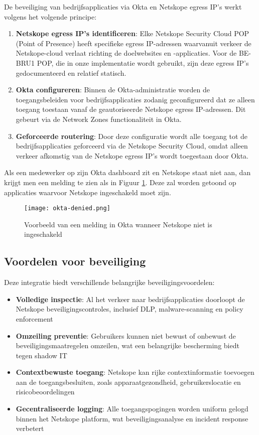 De beveiliging van bedrijfsapplicaties via Okta en Netskope egress IP's werkt volgens het volgende principe:

\begin{enumerate}
    \item \textbf{Netskope egress IP's identificeren}: Elke Netskope Security Cloud POP (Point of Presence) heeft specifieke egress IP-adressen waarvanuit verkeer de Netskope-cloud verlaat richting de doelwebsites en -applicaties. Voor de BE-BRU1 POP, die in onze implementatie wordt gebruikt, zijn deze egress IP's gedocumenteerd en relatief statisch.

    \item \textbf{Okta configureren}: Binnen de Okta-administratie worden de toegangsbeleiden voor bedrijfsapplicaties zodanig geconfigureerd dat ze alleen toegang toestaan vanaf de geautoriseerde Netskope egress IP-adressen. Dit gebeurt via de Network Zones functionaliteit in Okta.

    \item \textbf{Geforceerde routering}: Door deze configuratie wordt alle toegang tot de bedrijfsapplicaties geforceerd via de Netskope Security Cloud, omdat alleen verkeer afkomstig van de Netskope egress IP's wordt toegestaan door Okta.
\end{enumerate}

Als een medewerker op zijn Okta dashboard zit en Netskope staat niet aan, dan krijgt men een melding te zien als in Figuur \ref{fig:okta-denied}. Deze zal worden getoond op applicaties waarvoor Netskope ingeschakeld moet zijn.
\begin{figure}[H]
    \centering
    \texttt{[image: okta-denied.png]}
    \caption[Geen Netskope Okta melding]{Voorbeeld van een melding in Okta wanneer Netskope niet is ingeschakeld}
    \label{fig:okta-denied}
\end{figure}

\subsection{Voordelen voor beveiliging}

Deze integratie biedt verschillende belangrijke beveiligingsvoordelen:

\begin{itemize}
    \item \textbf{Volledige inspectie}: Al het verkeer naar bedrijfsapplicaties doorloopt de Netskope beveiligingscontroles, inclusief DLP, malware-scanning en policy enforcement
    \item \textbf{Omzeiling preventie}: Gebruikers kunnen niet bewust of onbewust de beveiligingsmaatregelen omzeilen, wat een belangrijke bescherming biedt tegen shadow IT
    \item \textbf{Contextbewuste toegang}: Netskope kan rijke contextinformatie toevoegen aan de toegangsbesluiten, zoals apparaatgezondheid, gebruikerslocatie en risicobeoordelingen
    \item \textbf{Gecentraliseerde logging}: Alle toegangspogingen worden uniform gelogd binnen het Netskope platform, wat beveiligingsanalyse en incident response verbetert
\end{itemize}

